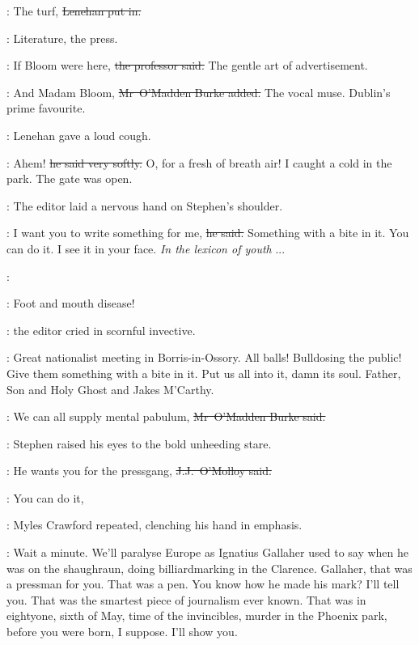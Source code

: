 \lenehan:
The turf,
\sout{Lenehan put in.}

\crawford:
Literature,
the press.

\machugh:
If Bloom were here,
\sout{the professor said.}
The gentle art of advertisement.

\omaddenburke:
And Madam Bloom,
\sout{Mr~O'Madden Burke added.}
The vocal muse.
Dublin's prime favourite.%

:
Lenehan gave a loud cough.

\lenehan:
Ahem!
\sout{he said very softly.}
O, for a fresh of breath air!
I caught a cold in the park.
The gate was open.



:
The editor laid a nervous hand on Stephen's shoulder.

\crawford:
I want you to write something for me,
\sout{he said.}
Something with a bite in it.
You can do it.
I see it in your face.
\emph{In the lexicon of youth} ...

\StephenInt:

\crawford:
Foot and mouth disease!

:
the editor cried in scornful invective.

\crawford:
Great nationalist meeting in Borris-in-Ossory.
All balls!
Bulldosing the public!
Give them something with a bite in it.
Put us all into it,
damn its soul.
Father, Son and Holy Ghost
and Jakes M'Carthy.

\omaddenburke:
We can all supply mental pabulum,
\sout{Mr~O'Madden Burke said.}

:
Stephen raised his eyes to the bold unheeding stare.

\jjom:
He wants you for the pressgang,
\sout{J.J.~O'Molloy said.}



\crawford:
You can do it,

:
Myles Crawford repeated,
clenching his hand in emphasis.

\crawford:
Wait a minute.
We'll paralyse Europe as Ignatius Gallaher used to say
when he was on the shaughraun,
doing billiardmarking in the Clarence.
Gallaher, that was a pressman for you.
That was a pen.
You know how he made his mark?
I'll tell you.
That was the smartest piece of journalism ever known.
That was in eightyone, sixth of May,
time of the invincibles,
murder in the Phoenix park,
before you were born, I suppose.
I'll show you.

